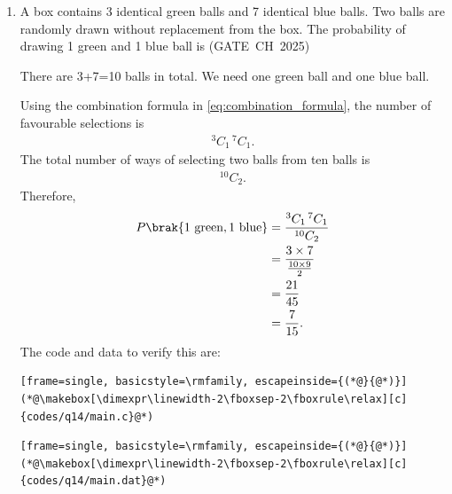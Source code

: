 \begin{enumerate}[label=\thesubsection.\arabic*, ref=\thesubsection.\theenumi,itemsep=0pt]
\item A box contains 3 identical green balls and 7 identical blue balls. Two balls are randomly drawn without replacement from the box. The probability of drawing 1 green and 1 blue ball is \hfill (GATE~CH~2025)
\begin{enumerate}[itemsep=0pt]
\end{enumerate}

\solution There are 3+7=10 balls in total. We need one green ball and one blue ball.

Using the combination formula in \eqref{eq:combination_formula}, the number of favourable selections is
\begin{align}
{}^3C_1\,{}^7C_1.
\end{align}
The total number of ways of selecting two balls from ten balls is
\begin{align}
{}^{10}C_2.
\end{align}
Therefore,
\begin{align}
P\brak{1\text{ green},1\text{ blue}}
&=\frac{{}^3C_1\,{}^7C_1}{{}^{10}C_2}\\
&=\frac{3\times7}{\frac{10\times9}{2}}\\
&=\frac{21}{45}\\
&=\frac{7}{15}.
\end{align}
The code and data to verify this are:
\begin{lstlisting}[frame=single, basicstyle=\rmfamily, escapeinside={(*@}{@*)}]
(*@\makebox[\dimexpr\linewidth-2\fboxsep-2\fboxrule\relax][c]{codes/q14/main.c}@*)
\end{lstlisting}

\begin{lstlisting}[frame=single, basicstyle=\rmfamily, escapeinside={(*@}{@*)}]
(*@\makebox[\dimexpr\linewidth-2\fboxsep-2\fboxrule\relax][c]{codes/q14/main.dat}@*)
\end{lstlisting}


\end{enumerate}
